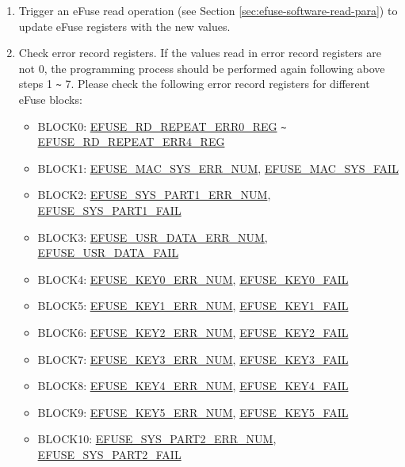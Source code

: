 \documentclass[main\_\_EN.tex]{subfiles}
\begin{document}
\begin{enumerate}
\item Trigger an eFuse read operation (see Section \ref{sec:efuse-software-read-para}) to update eFuse registers with the new values.
\item Check error record registers. If the values read in error record registers are not 0, the programming process should be performed again following above steps 1 \verb+~+ 7. Please check the following error record registers for different eFuse blocks:
\begin{itemize}
    \item BLOCK0: \hyperref[regdesc:EFUSERDREPEATERR0REG]{EFUSE\_RD\_REPEAT\_ERR0\_REG} \verb+~+ \hyperref[regdesc:EFUSERDREPEATERR4REG]{EFUSE\_RD\_REPEAT\_ERR4\_REG}
    \item BLOCK1: \hyperref[fielddesc:EFUSEMACSYSERRNUM] {EFUSE\_MAC\_SYS\_ERR\_NUM}, \hyperref[fielddesc:EFUSEMACSYSFAIL] {EFUSE\_MAC\_SYS\_FAIL}
    \item BLOCK2: \hyperref[fielddesc:EFUSESYSPART1ERRNUM] {EFUSE\_SYS\_PART1\_ERR\_NUM}, \hyperref[fielddesc:EFUSESYSPART1FAIL] {EFUSE\_SYS\_PART1\_FAIL}
    \item BLOCK3: \hyperref[fielddesc:EFUSEUSRDATAERRNUM] {EFUSE\_USR\_DATA\_ERR\_NUM}, \hyperref[fielddesc:EFUSEUSRDATAFAIL] {EFUSE\_USR\_DATA\_FAIL}
    \item BLOCK4: \hyperref[fielddesc:EFUSEKEY0ERRNUM] {EFUSE\_KEY0\_ERR\_NUM}, \hyperref[fielddesc:EFUSEKEY0FAIL] {EFUSE\_KEY0\_FAIL}
    \item BLOCK5: \hyperref[fielddesc:EFUSEKEY1ERRNUM] {EFUSE\_KEY1\_ERR\_NUM}, \hyperref[fielddesc:EFUSEKEY1FAIL] {EFUSE\_KEY1\_FAIL}
    \item BLOCK6: \hyperref[fielddesc:EFUSEKEY2ERRNUM] {EFUSE\_KEY2\_ERR\_NUM}, \hyperref[fielddesc:EFUSEKEY2FAIL] {EFUSE\_KEY2\_FAIL}
    \item BLOCK7: \hyperref[fielddesc:EFUSEKEY3ERRNUM] {EFUSE\_KEY3\_ERR\_NUM}, \hyperref[fielddesc:EFUSEKEY3FAIL] {EFUSE\_KEY3\_FAIL}
    \item BLOCK8: \hyperref[fielddesc:EFUSEKEY4ERRNUM] {EFUSE\_KEY4\_ERR\_NUM}, \hyperref[fielddesc:EFUSEKEY4FAIL] {EFUSE\_KEY4\_FAIL}
    \item BLOCK9: \hyperref[fielddesc:EFUSEKEY5ERRNUM] {EFUSE\_KEY5\_ERR\_NUM}, \hyperref[fielddesc:EFUSEKEY5FAIL] {EFUSE\_KEY5\_FAIL}
    \item BLOCK10: \hyperref[fielddesc:EFUSESYSPART2ERRNUM] {EFUSE\_SYS\_PART2\_ERR\_NUM}, \hyperref[fielddesc:EFUSESYSPART2FAIL] {EFUSE\_SYS\_PART2\_FAIL}
\end{itemize}
\end{enumerate}
\end{document}
